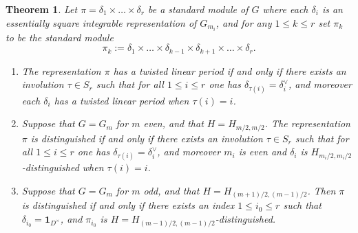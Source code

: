 \documentclass[11pt,letterpaper]{amsart}
\newcommand{\triv}{{\mathbf{1}}}
\def\d{\delta}
\theoremstyle{plain}
\newtheorem{thm}{Theorem}[section] \newtheorem{cor}[thm]{Corollary}
\numberwithin{equation}{section}
\begin{document}
\begin{thm}\label{thm linear std}
Let $\pi=\d_1\times \dots \times \d_r$ be a standard module of $G$ where 
each $\d_i$ is an essentially square integrable representation of $G_{m_i}$, and for any $1\leq k \leq r$ set $\pi_k$ to be the standard module 
\[\pi_k:=\d_1\times \dots \times \d_{k-1} \times  \d_{k+1} \times \dots \times \d_r.\]
\begin{enumerate}
\item\label{eq suz} The representation $\pi$ has a twisted linear period if and only if there exists an involution $\tau\in S_r$ such that for all $1\leq i \leq r$ one has $\d_{\tau(i)}=\d_i^\vee$, and moreover each $\d_i$ has a twisted linear period when $\tau(i)=i$.
\item\label{b} Suppose that $G=G_m$ for $m$ even, and that $H=H_{m/2,m/2}$. The representation $\pi$ is distinguished if and only if there exists an involution $\tau\in S_r$ such that for all $1\leq i \leq r$ one has $\d_{\tau(i)}=\d_i^\vee$, and moreover $m_i$ is even and $\d_i$ is $H_{m_i/2,m_i/2}$-distinguished when $\tau(i)=i$.
\item\label{c} Suppose that $G=G_m$ for $m$ odd, and that $H=H_{(m+1)/2,(m-1)/2}$. Then $\pi$ is distinguished if and only if there exists an index $1\leq i_0 \leq r$ such that $\d_{i_0}=\triv_{D^\times}$, and $\pi_{i_0}$ is $H=H_{(m-1)/2,(m-1)/2}$-distinguished.
\end{enumerate}
\end{thm}   
\end{document}
